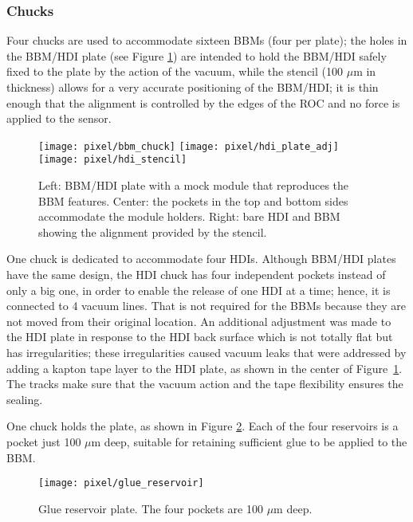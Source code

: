\subsubsection*{Chucks}

Four chucks are used to accommodate sixteen BBMs (four per plate); the holes in the BBM/HDI plate (see Figure \ref{fig:bbm_hdi_plates}) are intended to hold the BBM/HDI safely fixed to the plate by the action of the vacuum, while the stencil (100 $\mu$m in thickness) allows for a very accurate positioning of the BBM/HDI; it is thin enough that the alignment is controlled by the edges of the ROC and no force is applied to the sensor.     

\begin{figure}[!h]
  \centering
  \texttt{[image: pixel/bbm\_chuck]}
  \texttt{[image: pixel/hdi\_plate\_adj]}
  \texttt{[image: pixel/hdi\_stencil]}
  \caption[BBM/HDI plate]{Left: BBM/HDI plate with a mock module that reproduces the BBM features. Center: the pockets in the top and bottom sides accommodate the module holders. Right: bare HDI and BBM showing the alignment provided by the stencil.}\label{fig:bbm_hdi_plates}
\end{figure}

One chuck is dedicated to accommodate four HDIs. Although BBM/HDI plates have the same design, the HDI chuck has four independent pockets instead of only a big one, in order to enable the release of one HDI at a time; hence, it is connected to 4 vacuum lines. That is not required for the BBMs because they are not moved from their original location. An additional adjustment was made to the HDI plate in response to the HDI back surface which is not totally flat but has irregularities; these irregularities caused vacuum leaks that were addressed by adding a kapton tape layer to the HDI plate, as shown in the center of Figure~\ref{fig:bbm_hdi_plates}. The tracks make sure that the vacuum action and the tape flexibility ensures the sealing.    

One chuck holds the  plate, as shown in Figure \ref{fig:glue_reservoir}. Each of the four reservoirs is a pocket just 100 $\mu$m deep, suitable for retaining sufficient glue to be applied to the BBM.  

\begin{figure}[!h]
  \centering
  \texttt{[image: pixel/glue\_reservoir]}
  \caption[Glue reservoir plate]{Glue reservoir plate. The four pockets are 100 $\mu$m deep. }\label{fig:glue_reservoir}
\end{figure}


